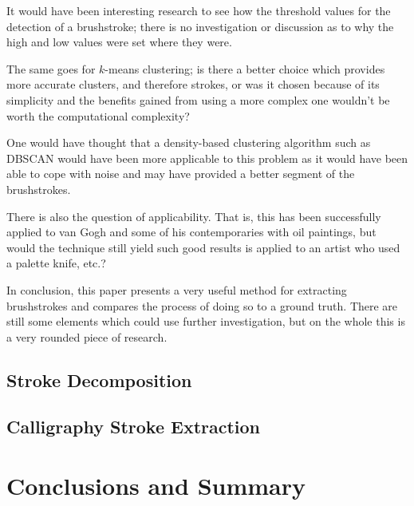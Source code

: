 \documentclass[conference]{IEEEtran}
\begin{document}
It would have been interesting research to see how the threshold values for the
detection of a brushstroke; there is no investigation or discussion as to why
the high and low values were set where they were.

The same goes for $k$-means clustering; is there a better choice which provides
more accurate clusters, and therefore strokes, or was it chosen because of its
simplicity and the benefits gained from using a more complex one wouldn't be
worth the computational complexity?

One would have thought that a density-based clustering algorithm such as
DBSCAN\cite{kriegel11density} would have been more applicable to this problem
as it would have been able to cope with noise and may have provided a better
segment of the brushstrokes.

There is also the question of applicability. That is, this has been 
successfully applied to van Gogh and some of his contemporaries with oil
paintings, but would the technique still yield such good results is applied to
an artist who used a palette knife, etc.?

In conclusion, this paper presents a very useful method for extracting
brushstrokes and compares the process of doing so to a ground truth. There are
still some elements which could use further investigation, but on the whole
this is a very rounded piece of research.

\subsection{Stroke Decomposition}

\subsection{Calligraphy Stroke Extraction}

\section{Conclusions and Summary}









\end{document}
